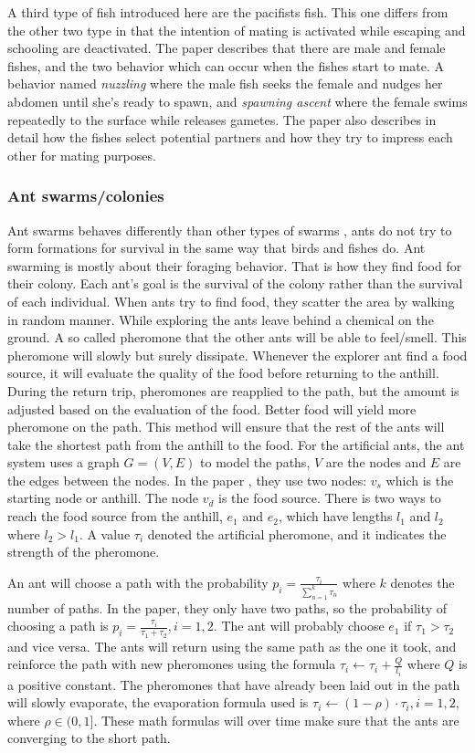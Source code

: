 A third type of fish introduced here are the pacifists fish. This one differs from the other two type in that the intention of mating is activated while escaping and schooling are deactivated.
The paper describes that there are male and female fishes, and the two behavior which can occur when the fishes start to mate. A behavior named \textit{nuzzling} where the male fish seeks the female and nudges her abdomen until she's ready to spawn, and \textit{spawning ascent} where the female swims repeatedly to the surface while releases gametes. The paper also describes in detail how the fishes select potential partners and how they try to impress each other for mating purposes.

\subsubsection{Ant swarms/colonies}
Ant swarms behaves differently than other types of swarms \citep{Blum2005}, ants do not try to form formations for survival in the same way that birds and fishes do. Ant swarming is mostly about their foraging behavior. That is how they find food for their colony. Each ant's goal is the survival of the colony rather than the survival of each individual. When ants try to find food, they scatter the area by walking in random manner. While exploring the ants leave behind a chemical on the ground. A so called pheromone that the other ants will be able to feel/smell. This pheromone will slowly but surely dissipate. Whenever the explorer ant find a food source, it will evaluate the quality of the food before returning to the anthill. During the return trip, pheromones are reapplied to the path, but the amount is adjusted based on the evaluation of the food. Better food will yield more pheromone on the path. This method will ensure that the rest of the ants will take the shortest path from the anthill to the food. For the artificial ants, the ant system uses a graph $G = (V,E)$ to model the paths, $V$ are the nodes and $E$ are the edges between the nodes. In the paper \citep{Blum2005}, they use two nodes: $v_s$ which is the starting node or anthill. The node $v_d$ is the food source. There is two ways to reach the food source from the anthill, $e_1$ and $e_2$, which have lengths $l_1$ and $l_2$ where $l_2 > l_1$. A value $\tau_i$ denoted the artificial pheromone, and it indicates the strength of the pheromone. 

An ant will choose a path with the probability $p_i = \frac{\tau_i}{\sum_{ n = 1}^{k}\tau_n}$ where $k$ denotes the number of paths. In the paper, they only have two paths, so the probability of choosing a path is $p_i = \frac{\tau_i}{\tau_1 + \tau_2}, i = 1,2$.
The ant will probably choose $e_1$ if $\tau_1 > \tau_2$ and vice versa.
The ants will return using the same path as the one it took, and reinforce the path with new pheromones using the formula $\tau_i \leftarrow \tau_i + \frac{Q}{l_i}$ where $Q$ is a positive constant. The pheromones that have already been laid out in the path will slowly evaporate, the evaporation formula used is $\tau_i \leftarrow (1-\rho)\cdot\tau_i, i = 1,2$, where $\rho \in (0,1]$. These math formulas will over time make sure that the ants are converging to the short path.

